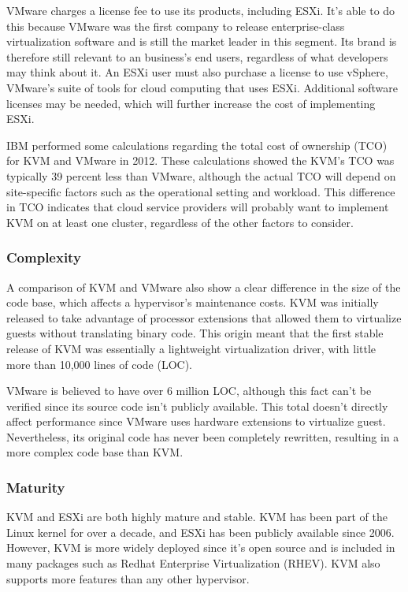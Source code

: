 \documentclass[14pt]{extreport}
\begin{document}
VMware charges a license fee to use its products, including ESXi. It’s able to do this because VMware was the first company to release enterprise-class virtualization software and is still the market leader in this segment. Its brand is therefore still relevant to an business’s end users, regardless of what developers may think about it. An ESXi user must also purchase a license to use vSphere, VMware’s suite of tools for cloud computing that uses ESXi. Additional software licenses may be needed, which will further increase the cost of implementing ESXi.

IBM performed some calculations regarding the total cost of ownership (TCO) for KVM and VMware in 2012. These calculations showed the KVM’s TCO was typically 39 percent less than VMware, although the actual TCO will depend on site-specific factors such as the operational setting and workload. This difference in TCO indicates that cloud service providers will probably want to implement KVM on at least one cluster, regardless of the other factors to consider.
\subsubsection{Complexity}

A comparison of KVM and VMware also show a clear difference in the size of the code base, which affects a hypervisor’s maintenance costs. KVM was initially released to take advantage of processor extensions that allowed them to virtualize guests without translating binary code. This origin meant that the first stable release of KVM was essentially a lightweight virtualization driver, with little more than 10,000 lines of code (LOC).

VMware is believed to have over 6 million LOC, although this fact can’t be verified since its source code isn’t publicly available. This total doesn’t directly affect performance since VMware uses hardware extensions to virtualize guest. Nevertheless, its original code has never been completely rewritten, resulting in a more complex code base than KVM.
\subsubsection{Maturity}

KVM and ESXi are both highly mature and stable. KVM has been part of the Linux kernel for over a decade, and ESXi has been publicly available since 2006. However, KVM is more widely deployed since it’s open source and is included in many packages such as Redhat Enterprise Virtualization (RHEV). KVM also supports more features than any other hypervisor.
\end{document}
